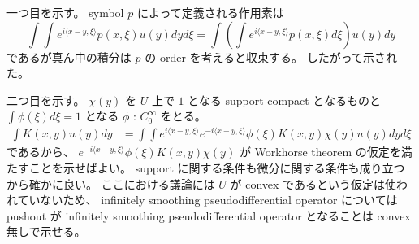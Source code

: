 一つ目を示す。
symbol \(p\) によって定義される作用素は 
\[\int \int e^{i \langle x - y, \xi \rangle} p(x,\xi) u(y) dy d\xi = \int \left(\int e^{i \langle x-y,\xi \rangle} p(x,\xi) d\xi \right) u(y) dy\]
であるが真ん中の積分は \(p\) の order を考えると収束する。
したがって示された。

二つ目を示す。
\(\chi(y)\) を \(U\) 上で \(1\) となる support compact となるものと \(\int \phi(\xi) d\xi = 1\) となる \(\phi\) : \(C^\infty_0\) をとる。
\begin{align*}
  \int K(x,y) u(y) dy
  &= \int \int e^{i \langle x-y , \xi \rangle} e^{- i \langle x-y , \xi \rangle} \phi(\xi) K(x,y) \chi(y) u(y) dy d\xi
\end{align*}
であるから、 \(e^{- i \langle x-y , \xi \rangle} \phi(\xi) K(x,y) \chi(y)\) が Workhorse theorem の仮定を満たすことを示せばよい。
support に関する条件も微分に関する条件も成り立つから確かに良い。
ここにおける議論には \(U\) が convex であるという仮定は使われていないため、 infinitely smoothing pseudodifferential operator については pushout が infinitely smoothing pseudodifferential operator となることは convex 無しで示せる。